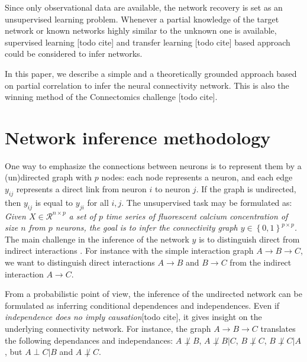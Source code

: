 \documentclass[wcp]{jmlr}
\begin{document}
Since only observational data are available, the network recovery is set as an
unsupervised learning problem. Whenever a partial knowledge of the target
network or known networks highly similar to the unknown one is available,
supervised learning [todo cite] and transfer learning  [todo cite] based
approach could be considered to infer networks.


In this paper, we describe a simple and a theoretically grounded approach
based on partial correlation to infer the neural connectivity network.
This is also the winning method of the Connectomics challenge [todo cite].

\section{Network inference methodology}

One way to emphasize the connections between neurons is to represent them by a
(un)directed graph with $p$ nodes: each node represents a neuron, and each
edge $y_{ij}$ represents a direct link from neuron  $i$ to neuron $j$. If the
graph is undirected, then $y_{ij}$ is equal to $y_{ji}$  for all $i,j$.
The unsupervised task may be formulated as:
\textit{Given $X \in \mathcal{R}^{n \times p}$  a set of $p$ time series of
fluorescent calcium concentration of size $n$ from $p$ neurons, the goal is to
infer the connectivity graph $y \in \left\{0, 1\right\}^{p \times p}$.}
The main challenge in the inference of the network $y$
is to distinguish direct from indirect interactions \cite{de2004discovery}.
For instance with the simple interaction graph $A \rightarrow B \rightarrow C$,
we want to distinguish direct interactions $A \rightarrow B$ and $B \rightarrow C$
from the indirect interaction $A \rightarrow C$.

From a probabilistic point of view, the inference of the undirected network
can be formulated as inferring conditional dependences and
independences.  Even if \textit{independence
does no imply causation}[todo cite], it gives insight on the underlying connectivity
network. For instance, the graph $A \rightarrow B \rightarrow C$ translates the
following dependances and independances: $A \not\perp B$, $A \not\perp B | C$,
$B \not\perp C$, $B \not\perp C | A$, but $A \perp C | B$ and  $A \not\perp C$.
\end{document}
